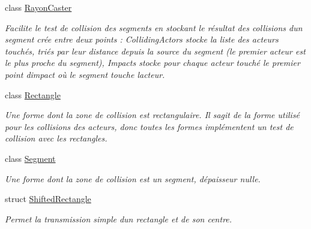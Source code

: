 \begin{DoxyCompactItemize}
class \hyperlink{class_tentacle_slicers_1_1collisions_1_1_rayon_caster}{Rayon\+Caster}
\begin{DoxyCompactList}\small\item\em Facilite le test de collision des segments en stockant le résultat des collisions d\textquotesingle{}un segment crée entre deux points \+: Colliding\+Actors stocke la liste des acteurs touchés, triés par leur distance depuis la source du segment (le premier acteur est le plus proche du segment), Impacts stocke pour chaque acteur touché le premier point d\textquotesingle{}impact où le segment touche l\textquotesingle{}acteur. \end{DoxyCompactList}\item 
class \hyperlink{class_tentacle_slicers_1_1collisions_1_1_rectangle}{Rectangle}
\begin{DoxyCompactList}\small\item\em Une forme dont la zone de collision est rectangulaire. Il s\textquotesingle{}agit de la forme utilisé pour les collisions des acteurs, donc toutes les formes implémentent un test de collision avec les rectangles. \end{DoxyCompactList}\item 
class \hyperlink{class_tentacle_slicers_1_1collisions_1_1_segment}{Segment}
\begin{DoxyCompactList}\small\item\em Une forme dont la zone de collision est un segment, d\textquotesingle{}épaisseur nulle. \end{DoxyCompactList}\item 
struct \hyperlink{struct_tentacle_slicers_1_1collisions_1_1_shifted_rectangle}{Shifted\+Rectangle}
\begin{DoxyCompactList}\small\item\em Permet la transmission simple d\textquotesingle{}un rectangle et de son centre. \end{DoxyCompactList}\end{DoxyCompactItemize}
